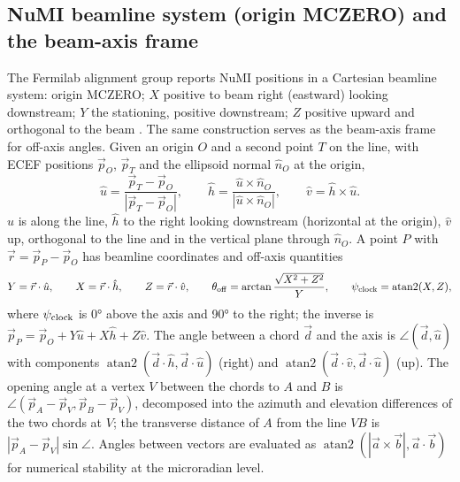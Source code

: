 \documentclass[11pt,letterpaper]{article}
\begin{document}
\subsection{NuMI beamline system (origin MCZERO) and the beam-axis frame}
\label{sec:beamline}
The Fermilab alignment group reports NuMI positions in a Cartesian beamline system: origin MCZERO; $X$ positive to beam right (eastward) looking downstream; $Y$ the stationing, positive downstream; $Z$ positive upward and orthogonal to the beam \cite{bocean2026fd,bocean2026nd}.  The same construction serves as the beam-axis frame for off-axis angles.  Given an origin $O$ and a second point $T$ on the line, with ECEF positions $\vec p_O$, $\vec p_T$ and the ellipsoid normal $\hat n_O$ at the origin,
\begin{equation}
\hat u=\frac{\vec p_T-\vec p_O}{|\vec p_T-\vec p_O|},\qquad
\hat h=\frac{\hat u\times\hat n_O}{|\hat u\times\hat n_O|},\qquad
\hat v=\hat h\times\hat u .
\label{eq:frame}
\end{equation}
$\hat u$ is along the line, $\hat h$ to the right looking downstream (horizontal at the origin), $\hat v$ up, orthogonal to the line and in the vertical plane through $\hat n_O$.  A point $P$ with $\vec r=\vec p_P-\vec p_O$ has beamline coordinates and off-axis quantities
\begin{equation}
Y=\vec r\cdot\hat u,\qquad X=\vec r\cdot\hat h,\qquad Z=\vec r\cdot\hat v,\qquad
\theta_{\rm off}=\arctan\frac{\sqrt{X^2+Z^2}}{Y},\qquad
\psi_{\rm clock}=\operatorname{atan2}(X,Z),
\label{eq:offaxis}
\end{equation}
where $\psi_{\rm clock}$ is \ang{0} above the axis and \ang{90} to the right; the inverse is $\vec p_P=\vec p_O+Y\hat u+X\hat h+Z\hat v$.  The angle between a chord $\vec d$ and the axis is $\angle(\vec d,\hat u)$ with components $\operatorname{atan2}(\vec d\cdot\hat h,\vec d\cdot\hat u)$ (right) and $\operatorname{atan2}(\vec d\cdot\hat v,\vec d\cdot\hat u)$ (up).  The opening angle at a vertex $V$ between the chords to $A$ and $B$ is $\angle(\vec p_A-\vec p_V,\vec p_B-\vec p_V)$, decomposed into the azimuth and elevation differences of the two chords at $V$; the transverse distance of $A$ from the line $VB$ is $|\vec p_A-\vec p_V|\sin\angle$.  Angles between vectors are evaluated as $\operatorname{atan2}(|\vec a\times\vec b|,\vec a\cdot\vec b)$ for numerical stability at the microradian level.
\end{document}
